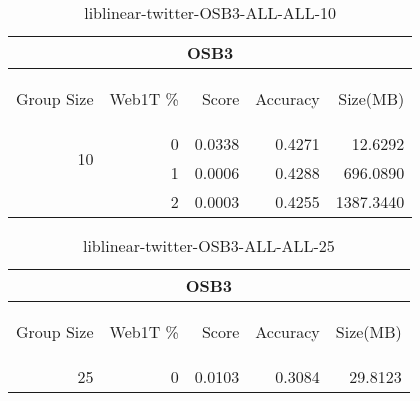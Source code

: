 \begin{center}
\begin{table}[htbp]
\begin{tabular}{ | r | r | r | r | r |}
\hline
\multicolumn{5}{|c|}{OSB3}\\
\hline
\begin{sideways}Group Size\end{sideways} & \begin{sideways}Web1T \%\end{sideways} & \begin{sideways}Score\end{sideways} & \begin{sideways}Accuracy\end{sideways} & \begin{sideways}Size(MB)\end{sideways}\\
\hline
\multirow{2}{*}{10}
 & 0 & 0.0338 & 0.4271 & 12.6292\\ \cline{2-5}
 & 1 & 0.0006 & 0.4288 & 696.0890\\ \cline{2-5}
 & 2 & 0.0003 & 0.4255 & 1387.3440\\ \cline{2-5}
\hline
\end{tabular}
\caption{liblinear-twitter-OSB3-ALL-ALL-10}
\label{table:liblinear-twitter-OSB3-ALL-ALL-10}
\end{table}
\end{center}

\begin{center}
\begin{table}[htbp]
\begin{tabular}{ | r | r | r | r | r |}
\hline
\multicolumn{5}{|c|}{OSB3}\\
\hline
\begin{sideways}Group Size\end{sideways} & \begin{sideways}Web1T \%\end{sideways} & \begin{sideways}Score\end{sideways} & \begin{sideways}Accuracy\end{sideways} & \begin{sideways}Size(MB)\end{sideways}\\
\hline
\multirow{0}{*}{25}
 & 0 & 0.0103 & 0.3084 & 29.8123\\ \cline{2-5}
\hline
\end{tabular}
\caption{liblinear-twitter-OSB3-ALL-ALL-25}
\label{table:liblinear-twitter-OSB3-ALL-ALL-25}
\end{table}
\end{center}

